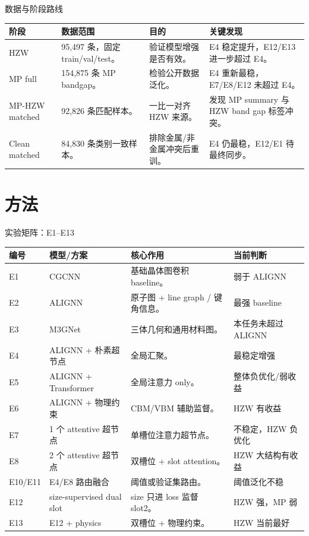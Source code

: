\documentclass[aspectratio=169]{beamer}
\begin{document}
\begin{frame}{数据与阶段路线}
\scriptsize
\centering
\setlength{\tabcolsep}{4pt}
\begin{tabularx}{\textwidth}{p{2.0cm} p{2.5cm} Y Y}
\toprule
阶段 & 数据范围 & 目的 & 关键发现 \\
\midrule
HZW & 95,497 条，固定 train/val/test。 & 验证模型增强是否有效。 & E4 稳定提升，E12/E13 进一步超过 E4。 \\
MP full & 154,875 条 MP bandgap。 & 检验公开数据泛化。 & E4 重新最稳，E7/E8/E12 未超过 E4。 \\
MP-HZW matched & 92,826 条匹配样本。 & 一比一对齐 HZW 来源。 & 发现 MP summary 与 HZW band gap 标签冲突。 \\
Clean matched & 84,830 条类别一致样本。 & 排除金属/非金属冲突后重训。 & E4 仍最稳，E12/E1 待最终同步。 \\
\bottomrule
\end{tabularx}
\end{frame}

\section{方法}

\begin{frame}{实验矩阵：E1--E13}
\tiny
\centering
\setlength{\tabcolsep}{3pt}
\begin{tabularx}{\textwidth}{p{0.7cm} p{3.1cm} Y p{2.5cm}}
\toprule
编号 & 模型/方案 & 核心作用 & 当前判断 \\
\midrule
E1 & CGCNN & 基础晶体图卷积 baseline。 & 弱于 ALIGNN \\
E2 & ALIGNN & 原子图 + line graph / 键角信息。 & 最强 baseline \\
E3 & M3GNet & 三体几何和通用材料图。 & 本任务未超过 ALIGNN \\
E4 & ALIGNN + 朴素超节点 & 全局汇聚。 & 最稳定增强 \\
E5 & ALIGNN + Transformer & 全局注意力 only。 & 整体负优化/弱收益 \\
E6 & ALIGNN + 物理约束 & CBM/VBM 辅助监督。 & HZW 有收益 \\
E7 & 1 个 attentive 超节点 & 单槽位注意力超节点。 & 不稳定，HZW 负优化 \\
E8 & 2 个 attentive 超节点 & 双槽位 + slot attention。 & HZW 大结构有收益 \\
E10/E11 & E4/E8 路由融合 & 阈值或验证集路由。 & 阈值泛化不稳 \\
E12 & size-supervised dual slot & size 只进 loss 监督 slot2。 & HZW 强，MP 弱 \\
E13 & E12 + physics & 双槽位 + 物理约束。 & HZW 当前最好 \\
\bottomrule
\end{tabularx}
\end{frame}
\end{document}
